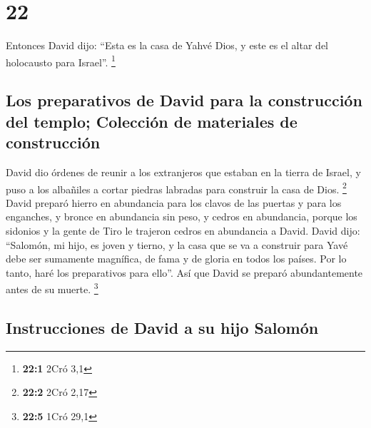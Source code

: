 \hypertarget{section-21}{%
\section{22}\label{section-21}}

 Entonces David dijo: ``Esta es la casa de Yahvé Dios, y
este es el altar del holocausto para Israel''. \footnote{\textbf{22:1}
  2Cró 3,1}

\hypertarget{los-preparativos-de-david-para-la-construcciuxf3n-del-templo-colecciuxf3n-de-materiales-de-construcciuxf3n}{%
\subsection{Los preparativos de David para la construcción del templo;
Colección de materiales de
construcción}\label{los-preparativos-de-david-para-la-construcciuxf3n-del-templo-colecciuxf3n-de-materiales-de-construcciuxf3n}}

 David dio órdenes de reunir a los extranjeros que estaban
en la tierra de Israel, y puso a los albañiles a cortar piedras labradas
para construir la casa de Dios. \footnote{\textbf{22:2} 2Cró 2,17}
 David preparó hierro en abundancia para los clavos de las
puertas y para los enganches, y bronce en abundancia sin peso,
 y cedros en abundancia, porque los sidonios y la gente de
Tiro le trajeron cedros en abundancia a David.  David
dijo: ``Salomón, mi hijo, es joven y tierno, y la casa que se va a
construir para Yavé debe ser sumamente magnífica, de fama y de gloria en
todos los países. Por lo tanto, haré los preparativos para ello''. Así
que David se preparó abundantemente antes de su muerte. \footnote{\textbf{22:5}
  1Cró 29,1}

\hypertarget{instrucciones-de-david-a-su-hijo-salomuxf3n}{%
\subsection{Instrucciones de David a su hijo
Salomón}\label{instrucciones-de-david-a-su-hijo-salomuxf3n}}

